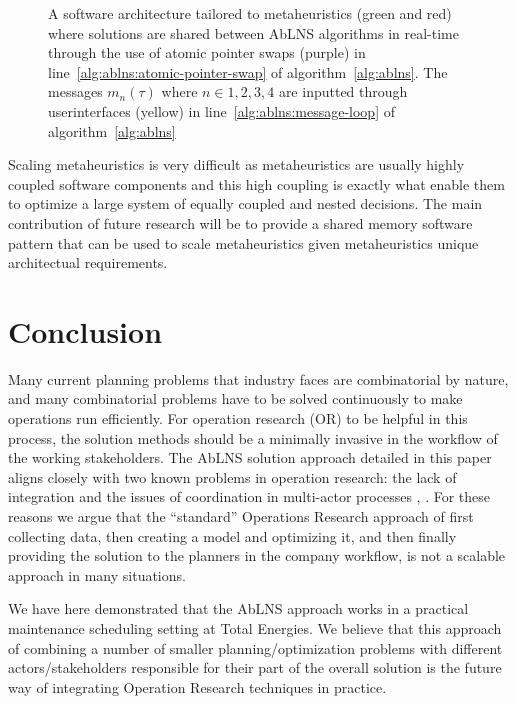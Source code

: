 \begin{figure}[H]
	
	\centering
	\resizebox{14cm}{!}{
		\drawModelSetupHexagon[simplified=true]
	}
	\caption{A software architecture tailored to metaheuristics (green and red)
		where solutions are shared between AbLNS algorithms in real-time through the
		use of atomic pointer swaps (purple) in line~\ref{alg:ablns:atomic-pointer-swap} of
		algorithm~\ref{alg:ablns}. The messages $m_{n}^{}(\tau)$ where $n\in {1,2,3,4}$ are
		inputted through userinterfaces (yellow) in line~\ref{alg:ablns:message-loop} of
		algorithm~\ref{alg:ablns}
	}\label{fig:discussion:hexagon-setup}
\end{figure}

Scaling metaheuristics is very difficult as metaheuristics are usually highly coupled
software components and this high coupling is exactly what enable them to optimize
a large system of equally coupled and nested decisions. The main contribution of 
future research will be to provide a shared memory software pattern that can be 
used to scale metaheuristics given metaheuristics unique architectual requirements.

\section{Conclusion}
Many current planning problems that industry faces are combinatorial by
nature, and many combinatorial problems have to be solved continuously to
make operations run efficiently. For operation research (OR) to be helpful
in this process, the solution methods should be a minimally invasive in the
workflow of the working stakeholders. The AbLNS solution approach detailed in
this paper aligns closely with two known problems in operation research: the
lack of integration and the issues of coordination in multi-actor processes
\citep{pinedoSchedulingTheoryAlgorithms2022chapter17}, \citep{pinedoSchedulingTheoryAlgorithms2022chapter18}.
For these reasons we argue that the ``standard'' Operations Research approach
of first collecting data, then creating a model and optimizing it, and then
finally providing the solution to the planners in the company workflow, is not a
scalable approach in many situations.

We have here demonstrated that the AbLNS approach works in a practical
maintenance scheduling setting at Total Energies. We believe that this approach
of combining a number of smaller planning/optimization problems with different
actors/stakeholders responsible for their part of the overall solution is the
future way of integrating Operation Research techniques in practice.

